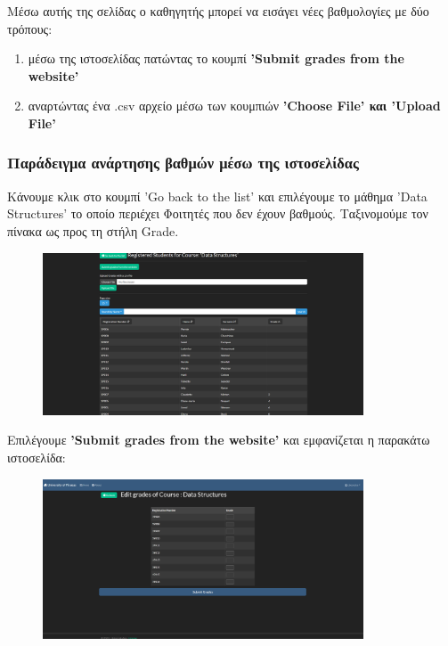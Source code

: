 \documentclass[12pt]{article}
\begin{document}
	
	Μέσω αυτής της σελίδας ο καθηγητής μπορεί να εισάγει νέες βαθμολογίες με δύο τρόπους: 
	
	\begin{enumerate}[label=(\alph*)]
		\item μέσω της ιστοσελίδας πατώντας το κουμπί \textbf{'Submit grades from the website'}
		
		\item αναρτώντας ένα .csv αρχείο μέσω των κουμπιών \textbf{'Choose File' και 'Upload File'}
	\end{enumerate}

	\subsubsection{Παράδειγμα ανάρτησης βαθμών μέσω της ιστοσελίδας}

	Κάνουμε κλικ στο κουμπί 'Go back to the list' και επιλέγουμε το μάθημα 'Data Structures' το οποίο περιέχει Φοιτητές που δεν έχουν βαθμούς. Ταξινομούμε τον πίνακα ως προς τη στήλη Grade.
	
	\begin{figure}[H]
		\centering
		\includegraphics[width=0.85\textwidth]{datas.png}
		\caption{}
		\label{fig:emptyView}
	\end{figure}

	Επιλέγουμε \textbf{'Submit grades from the website'} και εμφανίζεται η παρακάτω ιστοσελίδα:
	
		\begin{figure}[H]
		\centering
		\includegraphics[width=0.85\textwidth]{edits23.png}
		\caption{}
		\label{fig:emptyView}
		\end{figure}
	
\end{document}

